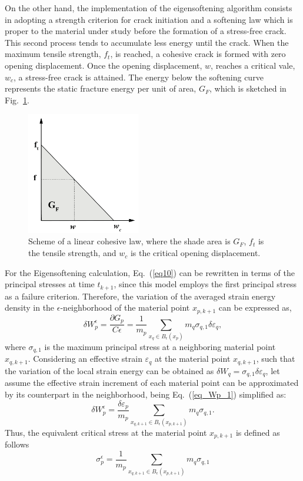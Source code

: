 \documentclass[applsci,journal,article,submit,moreauthors,pdftex]{Definitions/mdpi}
\begin{document}
On the other hand, the implementation of the eigensoftening algorithm consists in adopting a strength criterion for crack initiation and a softening law which is proper to the material under study before the formation of a stress-free crack. This second process tends to accumulate less energy until the crack. When the maximum tensile strength, $f_t$, is reached, a cohesive crack is formed with zero opening displacement. Once the opening displacement, $w$, reaches a critical vale, $w_c$, a stress-free crack is attained. The energy below the softening curve represents the static fracture energy per unit of area, $G_F$, which is sketched in Fig.~\ref{fig_GF}.
\begin{figure}
\centering
\includegraphics[width=0.44\textwidth]{Figs/GF.pdf}
\caption{Scheme of a linear cohesive law, where the shade area is $G_F$, $f_t$ is the tensile strength,  and $w_c$  is the critical opening displacement.}
\label{fig_GF}
\end{figure}
For the Eigensoftening calculation, Eq.~(\ref{eq10}) can be rewritten in terms of the principal stresses at time $t_{k+1}$, since this model employs the first principal stress as a failure criterion. Therefore, the variation of the averaged strain energy density in the $\epsilon$-neighborhood of the material point $x_{p, k+1}$ can be expressed as,
\begin{equation}\label{eq_Wp_1}
\delta W^\epsilon_{p} = \frac{\partial G_{p}}{C\epsilon} = \frac{1}{m_{p}}\sum_{x_{q}\in B_\epsilon (x_{p})} m_{q} \sigma_{q,1} \delta \varepsilon_q,
\end{equation}
where $\sigma_{q, 1}$ is the maximum principal stress at a neighboring material point $x_{q, k+1}$. Considering an effective strain $\varepsilon_q$ at the material point $x_{q, k+1}$, such that the variation of the local strain energy can be obtained as $\delta W_q = \sigma_{q, 1}\delta \varepsilon_q$, let assume the effective strain increment of each material point can be approximated by its counterpart in the neighborhood, being Eq.~(\ref{eq_Wp_1}) simplified as:
\begin{equation}\label{eq_Wp_3}
\delta W^\epsilon_{p}=\frac{\delta \varepsilon_p} {m_{p}} \sum_{x_{q,k+1}\in B_\epsilon (x_{p,k+1})} m_q \sigma_{q, 1}.
\end{equation}
Thus, the equivalent critical stress at the material point $x_{p, k+1}$ is defined as follows
\begin{equation}\label{eq_sigmap}
\sigma^{\epsilon}_{p}=\frac{1}{m_{p}}\sum_{x_{q,k+1}\in B_\epsilon (x_{p,k+1})}m_q \sigma_{q, 1}
\end{equation}
\end{document}
